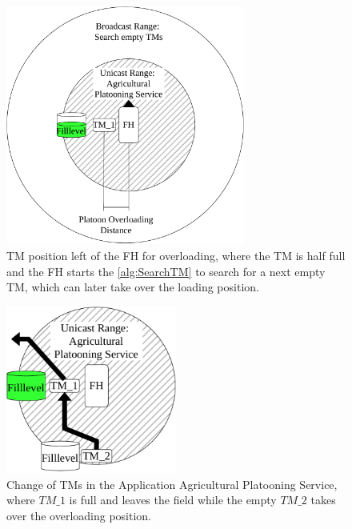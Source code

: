 \begin{figure}[H]%
	\centering
	\includegraphics[width=0.7\textwidth]{figures/platoonHALF}
	\caption{\acf{TM} position left of the \acf{FH} for overloading, where the \ac{TM} is half full and the
		\ac{FH} starts the \autoref{alg:SearchTM} to search for a next empty \ac{TM},
		which can later take over the loading position.}
	\label{fig:PlatooningHF}%
\end{figure}

\begin{figure}[H]%
	\centering
	\includegraphics[width=0.5\textwidth]{figures/platoonFULL}
	\caption{Change of \acf{TM}s in the Application Agricultural Platooning Service, where $TM\_1$
	is full and leaves the field while the empty $TM\_2$ takes over the overloading position.}
	\label{fig:PlatooningFull}%
\end{figure}


